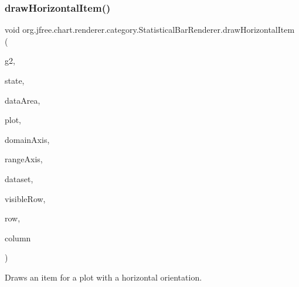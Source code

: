 \subsubsection{\texorpdfstring{draw\+Horizontal\+Item()}{drawHorizontalItem()}}
{\footnotesize\ttfamily void org.\+jfree.\+chart.\+renderer.\+category.\+Statistical\+Bar\+Renderer.\+draw\+Horizontal\+Item (\begin{DoxyParamCaption}\item[{Graphics2D}]{g2,  }\item[{\mbox{\hyperlink{classorg_1_1jfree_1_1chart_1_1renderer_1_1category_1_1_category_item_renderer_state}{Category\+Item\+Renderer\+State}}}]{state,  }\item[{Rectangle2D}]{data\+Area,  }\item[{\mbox{\hyperlink{classorg_1_1jfree_1_1chart_1_1plot_1_1_category_plot}{Category\+Plot}}}]{plot,  }\item[{\mbox{\hyperlink{classorg_1_1jfree_1_1chart_1_1axis_1_1_category_axis}{Category\+Axis}}}]{domain\+Axis,  }\item[{\mbox{\hyperlink{classorg_1_1jfree_1_1chart_1_1axis_1_1_value_axis}{Value\+Axis}}}]{range\+Axis,  }\item[{\mbox{\hyperlink{interfaceorg_1_1jfree_1_1data_1_1statistics_1_1_statistical_category_dataset}{Statistical\+Category\+Dataset}}}]{dataset,  }\item[{int}]{visible\+Row,  }\item[{int}]{row,  }\item[{int}]{column }\end{DoxyParamCaption})\hspace{0.3cm}{\ttfamily [protected]}}

Draws an item for a plot with a horizontal orientation.


